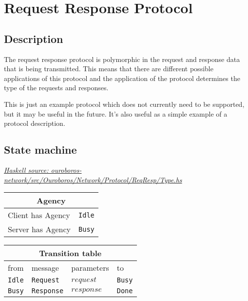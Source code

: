 \documentclass{report}
\newcommand{\hsref}[1]{\href{https://github.com/input-output-hk/ouroboros-network/blob/master/#1}{\emph{Haskell source: #1}}}
\newcommand{\state}[1]{\texttt{#1}}
\newcommand{\msg}[1]{\texttt{#1}}
\newcommand{\Idle}{\state{Idle}}
\newcommand{\Busy}{\state{Busy}}
\newcommand{\Done}{\state{Done}}
\theoremstyle{definition}{
  \newtheorem{lemma}{Lemma}[section] %
  \newtheorem{definition}[lemma]{Definition}
}
\theoremstyle{theorem}{
  \newtheorem{invariant}[lemma]{Invariant}
  \newtheorem{proofobligation}[lemma]{Proof Obligation}
}
\numberwithin{equation}{lemma}
\begin{document}
\section{Request Response Protocol}
\label{request-response-protocol}
\renewcommand{\Idle}{\state{Idle}}
\renewcommand{\Busy}{\state{Busy}}
\renewcommand{\Done}{\state{Done}}
\newcommand{\Request}{\msg{Request}}
\newcommand{\Response}{\msg{Response}}

\subsection{Description}
The request response protocol is polymorphic in the request and response data that is being transmitted.
This means that there are different possible applications of this protocol and the
application of the protocol determines the type of the requests and responses.

This is just an example protocol which does not currently need to be supported, but it
may be useful in the future.  It's also useful as a simple example of
a protocol description.

\subsection{State machine}
\hsref{ouroboros-network/src/Ouroboros/Network/Protocol/ReqResp/Type.hs}

\begin{tabular}{|l|l|}
  \hline
  \multicolumn{2}{|c|}{Agency} \\ \hline
  Client has Agency & \Idle \\  \hline
  Server has Agency & \Busy \\ \hline
\end{tabular}


\begin{tabular}{|l|l|l|l|} \hline
\multicolumn{4}{|c|}{Transition table} \\ \hline
  from         & message            & parameters             & to       \\ \hline\hline
  \Idle        & \Request           & $request$              & \Busy     \\ \hline
  \Busy        & \Response          & $response$             & \Done     \\ \hline
\end{tabular}
\end{document}
